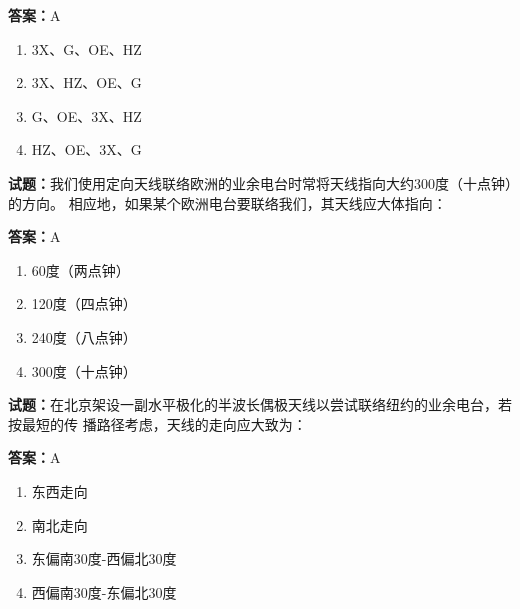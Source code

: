 \documentclass{ctexbook}
\begin{document}
\textbf{答案：}A 

\begin{enumerate}[leftmargin=3em]
  \item 3X、G、OE、HZ 

  \item 3X、HZ、OE、G 

  \item G、OE、3X、HZ 

  \item HZ、OE、3X、G 

\end{enumerate}





\vspace{1em}

\textbf{试题：}我们使用定向天线联络欧洲的业余电台时常将天线指向大约300度（十点钟）的方向。
相应地，如果某个欧洲电台要联络我们，其天线应大体指向： 

\textbf{答案：}A 

\begin{enumerate}[leftmargin=3em]
  \item 60度（两点钟） 

  \item 120度（四点钟） 

  \item 240度（八点钟） 

  \item 300度（十点钟） 

\end{enumerate}






\vspace{1em}

\textbf{试题：}在北京架设一副水平极化的半波长偶极天线以尝试联络纽约的业余电台，若按最短的传
播路径考虑，天线的走向应大致为： 

\textbf{答案：}A 

\begin{enumerate}[leftmargin=3em]
  \item 东西走向 

  \item 南北走向 

  \item 东偏南30度-西偏北30度 

  \item 西偏南30度-东偏北30度 

\end{enumerate}
\end{document}
